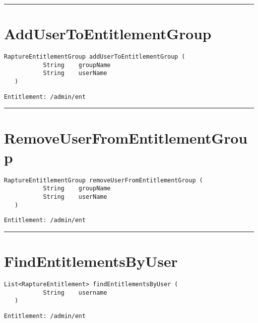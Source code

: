 \rule{12cm}{2pt}
\section{AddUserToEntitlementGroup}
\label{Api:AddUserToEntitlementGroup}
\begin{lstlisting}[style=nonumbers]
   RaptureEntitlementGroup addUserToEntitlementGroup (
           String    groupName
           String    userName
   )
\end{lstlisting}
\begin{Verbatim}[formatcom=\color{Maroon}]
  Entitlement: /admin/ent
\end{Verbatim}



\rule{12cm}{2pt}
\section{RemoveUserFromEntitlementGroup}
\label{Api:RemoveUserFromEntitlementGroup}
\begin{lstlisting}[style=nonumbers]
   RaptureEntitlementGroup removeUserFromEntitlementGroup (
           String    groupName
           String    userName
   )
\end{lstlisting}
\begin{Verbatim}[formatcom=\color{Maroon}]
  Entitlement: /admin/ent
\end{Verbatim}



\rule{12cm}{2pt}
\section{FindEntitlementsByUser}
\label{Api:FindEntitlementsByUser}
\begin{lstlisting}[style=nonumbers]
   List<RaptureEntitlement> findEntitlementsByUser (
           String    username
   )
\end{lstlisting}
\begin{Verbatim}[formatcom=\color{Maroon}]
  Entitlement: /admin/ent
\end{Verbatim}



